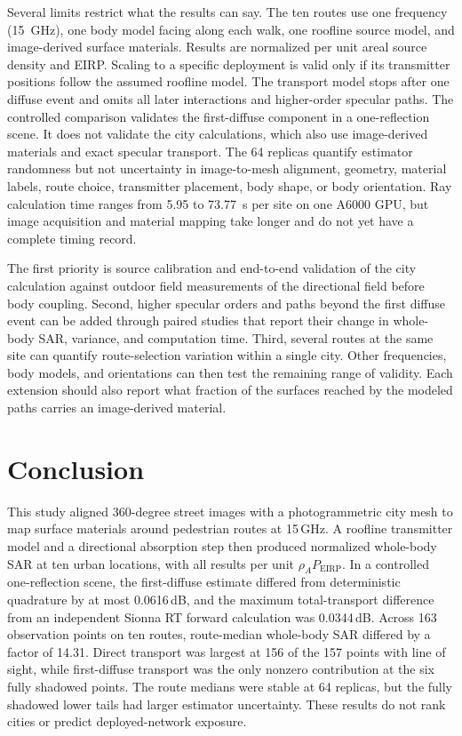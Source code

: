 \documentclass{ieeeaccess}
\begin{document}
Several limits restrict what the results can say. The ten routes use one
frequency (15~GHz), one body model facing along each walk, one roofline source
model, and image-derived surface materials. Results are normalized per unit
areal source density and EIRP. Scaling to a specific deployment is valid only
if its transmitter positions follow the assumed roofline model. The transport
model stops after one diffuse event and omits all later interactions and
higher-order specular paths. The controlled comparison validates the
first-diffuse component in a one-reflection scene. It does not validate the
city calculations, which also use image-derived materials and exact specular
transport. The 64 replicas quantify estimator randomness but not uncertainty in
image-to-mesh alignment, geometry, material labels, route choice, transmitter
placement, body shape, or body orientation. Ray calculation time ranges from
5.95 to 73.77~s per site on one A6000 GPU, but image acquisition and material
mapping take longer and do not yet have a complete timing record.

The first priority is source calibration and end-to-end validation of the city
calculation against outdoor field measurements of the directional field before
body coupling. Second, higher specular orders and paths beyond the first diffuse
event can be added through paired studies that report their change in whole-body
SAR, variance, and computation time. Third, several routes at the same site can
quantify route-selection variation within a single city. Other
frequencies, body models, and orientations can then test the remaining range of
validity. Each extension should also report what fraction of the surfaces
reached by the modeled paths carries an image-derived material.

\section{Conclusion}\label{sec:conclusion}

This study aligned 360-degree street images with a photogrammetric city mesh to
map surface materials around pedestrian routes at 15\,GHz. A roofline
transmitter model and a directional absorption step then produced normalized
whole-body SAR at ten urban locations, with all results per unit
$\rho_A P_{\mathrm{EIRP}}$. In a controlled one-reflection scene, the
first-diffuse estimate differed from deterministic quadrature by at most
0.0616\,dB, and the maximum total-transport difference from an independent
Sionna RT forward calculation was 0.0344\,dB. Across 163 observation points on
ten routes, route-median whole-body SAR differed by a factor of 14.31. Direct
transport was largest at 156 of the 157 points with line of sight, while
first-diffuse transport was the only nonzero contribution at the six fully
shadowed points.
The route medians were stable at 64 replicas, but the fully shadowed lower
tails had larger estimator uncertainty. These results do not rank cities or
predict deployed-network exposure.
\end{document}
